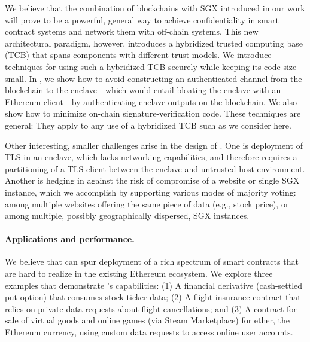 We believe that the combination of blockchains with SGX introduced in our work will prove to be a powerful, general way to achieve confidentiality in smart contract systems and network them with off-chain systems. This new architectural paradigm, however, introduces a hybridized trusted computing base (TCB) that spans components with different trust models.
We introduce techniques for using such a hybridized TCB securely while keeping its code size small. In \tc, we show how to avoid constructing an authenticated channel from the blockchain to the enclave---which would entail bloating the enclave with an Ethereum client---by authenticating enclave outputs on the blockchain. We also show how to minimize on-chain signature-verification code. These techniques are general: They apply to any use of a hybridized TCB such as we consider here.

Other interesting, smaller challenges arise in the design of \tc. One is deployment of TLS in an enclave, which lacks networking capabilities, and therefore requires a partitioning of a TLS client between the enclave and untrusted host environment. Another is hedging in \tc against the risk of compromise of a website or single SGX instance, which we accomplish by supporting various modes of majority voting: among multiple websites offering the same piece of data (e.g., stock price), or among multiple, possibly geographically dispersed, SGX instances.

\paragraph{Applications and performance.} 
We believe that \tc can spur deployment of a rich spectrum of smart contracts that are hard to realize in the existing Ethereum ecosystem. We explore three examples that demonstrate \tc's capabilities: (1) A financial derivative (cash-settled put option) that consumes stock ticker data; (2) A flight insurance contract that relies on private data requests about flight cancellations; and (3) A contract for sale of virtual goods and online games (via Steam Marketplace) for ether, the Ethereum currency, using custom data requests to access online user accounts. 

